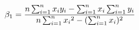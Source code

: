 \documentclass[preview]{standalone}
\begin{document}
\begin{align*}
{\special{dvisvgm:raw <g id='unique000'>}\beta_1=\frac{n\sum_{i=1}^n{x_i y_i}-\sum_{i=1}^n{x_i}\sum_{i=1}^n{y_i}}{n\sum_{i=1}^n{{x_i}^2}-(\sum_{i=1}^n{x_i})^2}}\special{dvisvgm:raw </g>}
\end{align*}
\end{document}
